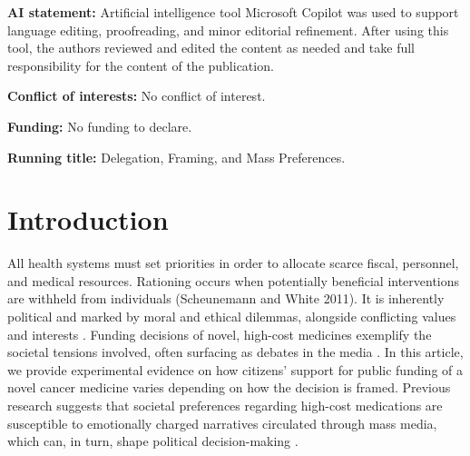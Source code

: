 \documentclass[11pt]{article}\usepackage[]{graphicx}\usepackage[]{xcolor}
\begin{document}
\vspace{1em}

{\noindent\bf AI statement:} Artificial intelligence tool Microsoft Copilot was used to support language editing, proofreading, and minor editorial refinement. After using this tool, the authors reviewed and edited the content as needed and take full responsibility for the content of the publication.

\vspace{1em}

{\noindent\bf Conflict of interests:} No conflict of interest.


\vspace{1em}

{\noindent\bf Funding:} No funding to declare.

\vspace{1em}

{\noindent\bf Running title:} Delegation, Framing, and Mass Preferences.

\clearpage
\pagestyle{plain}
\setcounter{page}{1}

\section{Introduction}
\setcounter{page}{1}

All health systems must set priorities in order to allocate scarce fiscal, personnel, and medical resources. Rationing occurs when potentially beneficial interventions are withheld from individuals (Scheunemann and White 2011). It is inherently political and marked by moral and ethical dilemmas, alongside conflicting values and interests \parencite{BaeroeBaltussen2014LegitimateLimitSetting, Baltussen2016PrioritySettingUHC}. Funding decisions of novel, high-cost medicines exemplify the societal tensions involved, often surfacing as debates in the media \parencite{AbelsonCollins2009MediaHypingHerceptin, CorbettMori1999MedicineMediaCelebrities}.
In this article, we provide experimental evidence on how citizens’ support for public funding of a novel cancer medicine varies depending on how the decision is framed. Previous research suggests that societal preferences regarding high-cost medications are susceptible to emotionally charged narratives circulated through mass media, which can, in turn, shape political decision-making \parencite{Gabe2012HerceptinCountervailingPowers, Aggarwal2017CancerDrugsFund, PinhoDiasCosta2020MassMediaObstacleRationing}.
\end{document}
